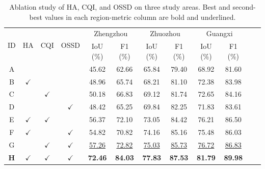 \begingroup
\begin{table}[H]
\centering
\comparisonfont
\captionsetup{name=Table,font=comparisoncaption,labelfont=bf,labelsep=newline,justification=raggedright,singlelinecheck=false}
\caption{Ablation study of HA, CQI, and OSSD on three study areas. Best and second-best values in each region-metric column are bold and underlined.}
\label{tab:ablation_modules}
\fontsize{8}{10}\selectfont
\setlength{\tabcolsep}{3pt}
\renewcommand{\arraystretch}{1.12}
\begin{tabular*}{\linewidth}{@{\extracolsep{\fill}}c ccc cccc cccc@{}}
\toprule
\multirow{2}{*}{ID} & \multirow{2}{*}{HA} & \multirow{2}{*}{CQI} & \multirow{2}{*}{OSSD} & \multicolumn{2}{c}{Zhengzhou} & \multicolumn{2}{c}{Zhuozhou} & \multicolumn{2}{c}{Guangxi} \\
\cmidrule(lr){5-6} \cmidrule(lr){7-8} \cmidrule(lr){9-10}
 & & & & IoU (\%) & F1 (\%) & IoU (\%) & F1 (\%) & IoU (\%) & F1 (\%) \\
\midrule
A & & & & 45.62 & 62.66 & 65.84 & 79.40 & 68.92 & 81.60 \\
B & \(\checkmark\) & & & 48.96 & 65.74 & 68.21 & 81.10 & 72.38 & 83.98 \\
C & & \(\checkmark\) & & 50.18 & 66.83 & 69.12 & 81.74 & 72.65 & 84.16 \\
D & & & \(\checkmark\) & 48.42 & 65.25 & 69.84 & 82.25 & 71.83 & 83.61 \\
E & \(\checkmark\) & \(\checkmark\) & & 56.37 & 72.10 & 73.05 & 84.42 & 76.21 & 86.50 \\
F & \(\checkmark\) & & \(\checkmark\) & 54.82 & 70.82 & 74.16 & 85.16 & 75.48 & 86.03 \\
G & & \(\checkmark\) & \(\checkmark\) & \underline{57.26} & \underline{72.82} & \underline{75.03} & \underline{85.73} & \underline{76.72} & \underline{86.83} \\
\textbf{H} & \textbf{\(\checkmark\)} & \textbf{\(\checkmark\)} & \textbf{\(\checkmark\)} & \textbf{72.46} & \textbf{84.03} & \textbf{77.83} & \textbf{87.53} & \textbf{81.79} & \textbf{89.98} \\
\bottomrule
\end{tabular*}
\end{table}
\endgroup
